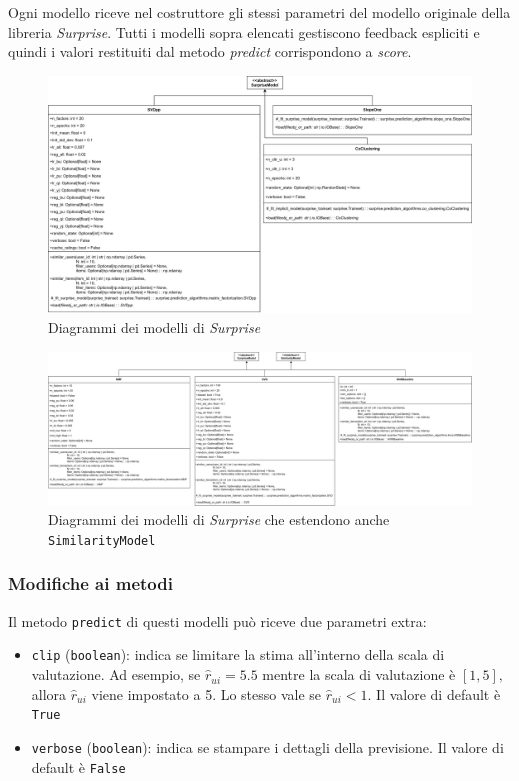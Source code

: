 Ogni modello riceve nel costruttore gli stessi parametri del modello originale della libreria \textit{Surprise}. Tutti i modelli sopra elencati gestiscono feedback espliciti e quindi i valori restituiti dal metodo \textit{predict} corrispondono a \textit{score}.

\begin{figure}[htbp]
    \centering
    \includegraphics[angle=90, scale=0.14]{figures/UML/models/surprise_models.png}
    \caption{Diagrammi dei modelli di \textit{Surprise}}
\end{figure}

\begin{figure}[htbp]
    \centering
    \includegraphics[angle=90, scale=0.095]{figures/UML/models/surprise_similarity_models.png}
    \caption{Diagrammi dei modelli di \textit{Surprise} che estendono anche \texttt{SimilarityModel}}
\end{figure}

\subsubsection{Modifiche ai metodi}

Il metodo \texttt{predict} di questi modelli può riceve due parametri extra:

\begin{itemize}
    \item \texttt{clip} (\texttt{boolean}): indica se limitare la stima all'interno della scala di valutazione. Ad esempio, se $\hat{r}_{ui} = 5.5$ mentre la scala di valutazione è $[1, 5],$ allora $\hat{r}_{ui}$ viene impostato a 5. Lo stesso vale se $\hat{r}_{ui} < 1.$ Il valore di default è \texttt{True}
    \item \texttt{verbose} (\texttt{boolean}): indica se stampare i dettagli della previsione. Il valore di default è \texttt{False}
\end{itemize}

